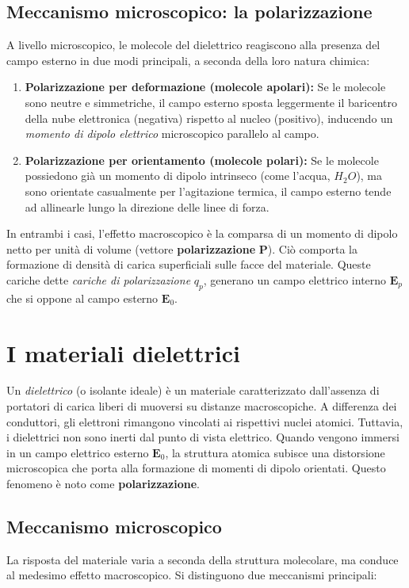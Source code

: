 \documentclass[a4paper,11pt]{report}
\begin{document}
\subsection{Meccanismo microscopico: la polarizzazione}
A livello microscopico, le molecole del dielettrico reagiscono alla presenza del campo esterno in due modi principali, a seconda della loro natura chimica:

\begin{enumerate}
    \item \textbf{Polarizzazione per deformazione (molecole apolari):} Se le molecole sono neutre e simmetriche, il campo esterno sposta leggermente il baricentro della nube elettronica (negativa) rispetto al nucleo (positivo), inducendo un \textit{momento di dipolo elettrico} microscopico parallelo al campo.
    \item \textbf{Polarizzazione per orientamento (molecole polari):} Se le molecole possiedono già un momento di dipolo intrinseco (come l'acqua, $H_2O$), ma sono orientate casualmente per l'agitazione termica, il campo esterno tende ad allinearle lungo la direzione delle linee di forza.
\end{enumerate}

In entrambi i casi, l'effetto macroscopico è la comparsa di un momento di dipolo netto per unità di volume (vettore \textbf{polarizzazione} $\bm{P}$).
Ciò comporta la formazione di densità di carica superficiali sulle facce del materiale. Queste cariche dette \textit{cariche di polarizzazione} $q_p$, generano un campo elettrico interno $\bm{E}_p$ che si oppone al campo esterno $\bm{E}_0$.



\section{I materiali dielettrici}

Un \textit{dielettrico} (o isolante ideale) è un materiale caratterizzato dall'assenza di portatori di carica liberi di muoversi su distanze macroscopiche. A differenza dei conduttori, gli elettroni rimangono vincolati ai rispettivi nuclei atomici.
Tuttavia, i dielettrici non sono inerti dal punto di vista elettrico. Quando vengono immersi in un campo elettrico esterno $\bm{E}_0$, la struttura atomica subisce una distorsione microscopica che porta alla formazione di momenti di dipolo orientati. Questo fenomeno è noto come \textbf{polarizzazione}.

\subsection{Meccanismo microscopico}
La risposta del materiale varia a seconda della struttura molecolare, ma conduce al medesimo effetto macroscopico. Si distinguono due meccanismi principali:
\end{document}
